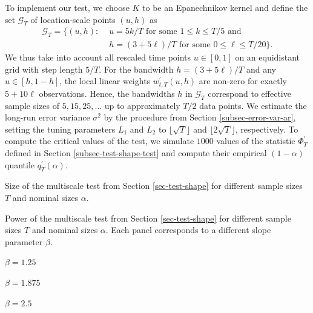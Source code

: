 \documentclass[a4paper,12pt]{article}
\begin{document}
To implement our test, we choose $K$ to be an Epanechnikov kernel and define the set $\mathcal{G}_T$ of location-scale points $(u,h)$ as
\begin{align}
\mathcal{G}_T = \big\{ (u, h): & \, \, u = 5k/T \text{ for some } 1 \le k \le T/5 \text{ and } \nonumber \\ & \, \, h = (3+5\ell)/T \text{ for some } 0 \le \ell \le T/20 \big\}. \label{grid-sim-app}
\end{align}
We thus take into account all rescaled time points $u \in [0,1]$ on an equidistant grid with step length $5/T$. For the bandwidth $h = (3 + 5\ell)/T$ and any $u \in [h,1-h]$, the local linear weights $w_{t,T}^\prime(u,h)$ are non-zero for exactly $5 + 10 \ell$ observations. Hence, the bandwidths $h$ in $\mathcal{G}_T$ correspond to effective sample sizes of $5, 15, 25, \ldots$ up to approximately $T/2$ data points. We estimate the long-run error variance $\sigma^2$ by the procedure from Section \ref{subsec-error-var-ar}, setting the tuning parameters $L_1$ and $L_2$ to $\lfloor \sqrt{T} \rfloor$ and $\lfloor 2\sqrt{T} \rfloor$, respectively. To compute the critical values of the test, we simulate $1000$ values of the statistic $\Phi^\prime_T$ defined in Section \ref{subsec-test-shape-test} and compute their empirical $(1-\alpha)$ quantile $q_T^\prime(\alpha)$. 


\begin{table}[t]
\footnotesize{
\begin{center}
\caption{Size of the multiscale test from Section \ref{sec-test-shape} for different sample sizes $T$ and nominal sizes $\alpha$.}
\label{tab:size_shape}
\renewcommand{\arraystretch}{1.2}

\end{center}}
\footnotesize{
\begin{center}
\caption{Power of the multiscale test from Section \ref{sec-test-shape} for different sample sizes $T$ and nominal sizes $\alpha$. Each panel corresponds to a different slope parameter $\beta$.}\label{tab:power_shape}
\begin{subtable}[b]{0.32\textwidth}
\centering
\caption{$\beta = 1.25$}\label{tab:power_050_ll_shape}
\renewcommand{\arraystretch}{1.2}

\end{subtable}
\begin{subtable}[b]{0.32\textwidth}
\centering
\caption{$\beta = 1.875$}\label{tab:power_075_ll_shape}
\renewcommand{\arraystretch}{1.2}

\end{subtable}
\begin{subtable}[b]{0.32\textwidth}
\centering
\caption{$\beta = 2.5$}\label{tab:power_100_ll_shape}
\renewcommand{\arraystretch}{1.2}

\end{subtable}
\end{center}}
\vspace{-0.4cm}
\end{table}
\end{document}
